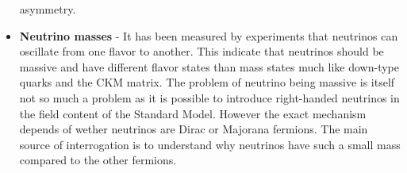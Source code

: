 \begin{itemize}
            asymmetry.
        \item \textbf{Neutrino masses} - It has been measured by experiments that neutrinos
            can oscillate from one flavor to another. This indicate that neutrinos should
            be massive and have different flavor states than mass states much like down-type
            quarks and the CKM matrix. The problem of neutrino being massive is itself not
            so much a problem as it is possible to introduce right-handed neutrinos in the
            field content of the Standard Model. However the exact mechanism depends of
            wether neutrinos are Dirac or Majorana fermions. The main source of interrogation
            is to understand why neutrinos have such a small mass compared to the other
            fermions.
    \end{itemize}

